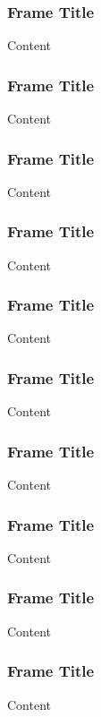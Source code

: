 \documentclass{beamer}
\begin{document}
\begin{frame}\frametitle{Frame Title}
\centering
Content
\end{frame}

\begin{frame}\frametitle{Frame Title}
\centering
Content
\end{frame}

\begin{frame}\frametitle{Frame Title}
\centering
Content
\end{frame}

\begin{frame}\frametitle{Frame Title}
\centering
Content
\end{frame}

\begin{frame}\frametitle{Frame Title}
\centering
Content
\end{frame}

\begin{frame}\frametitle{Frame Title}
\centering
Content
\end{frame}

\begin{frame}\frametitle{Frame Title}
\centering
Content
\end{frame}

\begin{frame}\frametitle{Frame Title}
\centering
Content
\end{frame}

\begin{frame}\frametitle{Frame Title}
\centering
Content
\end{frame}

\begin{frame}\frametitle{Frame Title}
\centering
Content
\end{frame}
\end{document}
